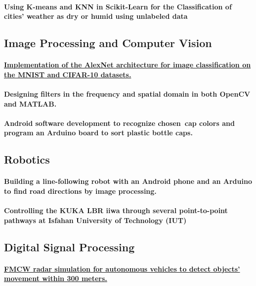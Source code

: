 \documentclass[a4paper]{article}
\begin{document}
            \paragraph{Using K-means and KNN in Scikit-Learn for the Classification of cities' weather as dry or humid using unlabeled data}

        \subsection{Image Processing and Computer Vision}

            \paragraph{\href{https://github.com/ake1999/CNN_AlexNet}{Implementation of the AlexNet architecture for image classification on the MNIST and CIFAR-10 datasets.}}
            \paragraph{Designing filters in the frequency and spatial domain in both OpenCV and MATLAB.}
            \paragraph{Android software development to recognize chosen cap colors and program an Arduino board to sort plastic bottle caps.}

        \subsection{Robotics}

            \paragraph{Building a line-following robot with an Android phone and an Arduino to find road directions by image processing.}
            \paragraph{Controlling the KUKA LBR iiwa through several point-to-point pathways at Isfahan University of Technology (IUT)}
        \subsection{Digital Signal Processing}
            \paragraph{\href{https://github.com/ake1999/FMCW_Radar_Ake}{FMCW radar simulation for autonomous vehicles to detect objects' movement within 300 meters.}}
\end{document}
